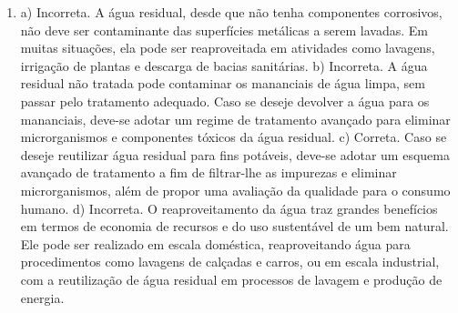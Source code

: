 \begin{enumerate}
\item
a) Incorreta. A água residual, desde que não tenha componentes
corrosivos, não deve ser contaminante das superfícies metálicas a serem
lavadas. Em muitas situações, ela pode ser reaproveitada em atividades
como lavagens, irrigação de plantas e descarga de bacias sanitárias.
b) Incorreta. A água residual não tratada pode contaminar os mananciais
de água limpa, sem passar pelo tratamento adequado. Caso se deseje
devolver a água para os mananciais, deve-se adotar um regime de
tratamento avançado para eliminar microrganismos e componentes tóxicos
da água residual.
c) Correta. Caso se deseje reutilizar água residual para fins potáveis,
deve-se adotar um esquema avançado de tratamento a fim de filtrar-lhe as
impurezas e eliminar microrganismos, além de propor uma
avaliação da qualidade para o consumo humano.
d) Incorreta. O reaproveitamento da água traz grandes benefícios em
termos de economia de recursos e do uso sustentável de um bem natural.
Ele pode ser realizado em escala doméstica, reaproveitando água para
procedimentos como lavagens de calçadas e carros, ou em escala
industrial, com a reutilização de água residual em processos de lavagem
e produção de energia.
\end{enumerate}


